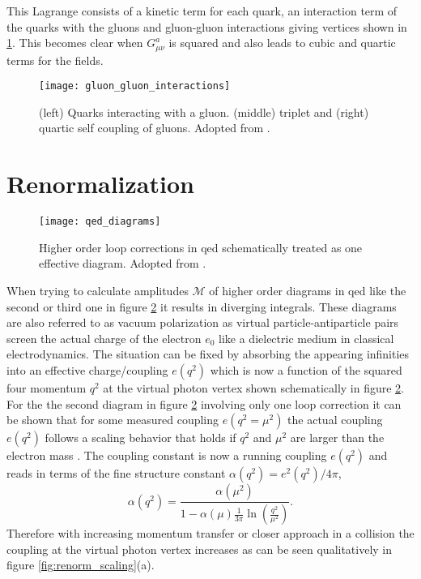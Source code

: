 This Lagrange consists of a kinetic term for each quark, an interaction term of the quarks with the gluons and gluon-gluon interactions giving vertices shown in \ref{fig:qcd_vertices}. This becomes clear when $G^a_{\mu\nu}$ is squared and also leads to cubic and quartic terms for the fields.
\begin{figure}[H]
    \centering
    \texttt{[image: gluon\_gluon\_interactions]}
    \caption[]{(left) Quarks interacting with a gluon. (middle) triplet and (right) quartic self coupling of gluons. Adopted from \citep{thomson2013modern}.}
    \label{fig:qcd_vertices}
\end{figure}

\section{Renormalization}
\begin{figure}
    \centering
    \texttt{[image: qed\_diagrams]}
    \caption[]{Higher order loop corrections in \ac{qed} schematically treated as one effective diagram. Adopted from \citep{thomson2013modern}.}
    \label{fig:qed_diagrams}
\end{figure}
When trying to calculate amplitudes $\mathcal{M}$ of higher order diagrams in \ac{qed} like the second or third one in figure \ref{fig:qed_diagrams} it results in diverging integrals. These diagrams are also referred to as vacuum polarization as virtual particle-antiparticle pairs screen the actual charge of the electron $e_0$ like a dielectric medium in classical electrodynamics. The situation can be fixed by absorbing the appearing infinities into an effective charge/coupling $e(q^2)$ which is now a function of the squared four momentum $q^2$ at the virtual photon vertex shown schematically in figure \ref{fig:qed_diagrams}. For the the second diagram in figure \ref{fig:qed_diagrams} involving only one loop correction it can be shown that for some measured coupling $e(q^2=\mu^2)$ the actual coupling $e(q^2)$ follows a scaling behavior that holds if $q^2$ and $\mu^2$ are larger than the electron mass \citep{thomson2013modern}. The coupling constant is now a running coupling $e(q^2)$ and reads in terms of the fine structure constant $\alpha(q^2)=e^2(q^2)/4\pi$,
\begin{equation}
    \alpha(q^2)=
    \frac{\alpha(\mu^2)}
    {1-\alpha(\mu)\frac{1}{3\pi}
        \ln
        \left(\frac{q^2}{\mu^2}\right)}.
    \label{eq:qed_coupling}
\end{equation}
Therefore with increasing momentum transfer or closer approach in a collision the coupling at the virtual photon vertex increases as can be seen qualitatively in figure \ref{fig:renorm_scaling}(a).
